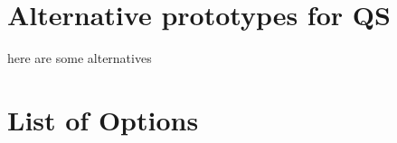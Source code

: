 \appendix

\section{Alternative prototypes for QS}
\label{sec:appendix_interface_alternative}

here are some alternatives

\section{List of Options}